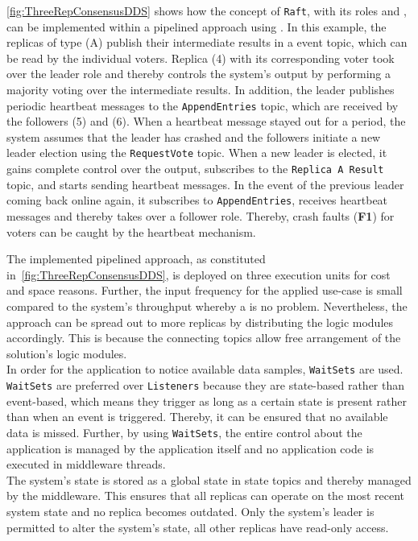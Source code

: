 \autoref{fig:ThreeRepConsensusDDS} shows how the concept of \texttt{Raft}, with its roles and , can be implemented within a pipelined approach using .
In this example, the replicas of type (A) publish their intermediate results in a  event topic, which can be read by the individual voters.
Replica (4) with its corresponding voter took over the leader role and thereby controls the system's output by performing a majority voting over the intermediate results.
In addition, the leader publishes periodic heartbeat messages to the \texttt{AppendEntries} topic, which are received by the followers (5) and (6).
When a heartbeat message stayed out for a period, the system assumes that the leader has crashed and the followers initiate a new leader election using the \texttt{RequestVote} topic.
When a new leader is elected, it gains complete control over the output, subscribes to the \texttt{Replica A Result} topic, and starts sending heartbeat messages.
In the event of the previous leader coming back online again, it subscribes to \texttt{AppendEntries}, receives heartbeat messages and thereby takes over a follower role.
Thereby, crash faults (\textbf{F1}) for voters can be caught by the heartbeat mechanism.

The implemented pipelined approach, as constituted in~\autoref{fig:ThreeRepConsensusDDS}, is deployed on three execution units for cost and space reasons.
Further, the input frequency for the applied use-case is small compared to the system's throughput whereby a \ChallengeThrough is no problem.
Nevertheless, the approach can be spread out to more replicas by distributing the logic modules accordingly.
This is because the connecting  topics allow free arrangement of the solution's logic modules.
\\

In order for the application to notice available data samples, \texttt{WaitSets} are used.
\texttt{WaitSets} are preferred over \texttt{Listeners} because they are state-based rather than event-based, which means they trigger as long as a certain state is present rather than when an event is triggered.
Thereby, it can be ensured that no available data is missed.
Further, by using \texttt{WaitSets}, the entire control about the application is managed by the application itself and no application code is executed in middleware threads.
\\

The system's state is stored as a global state in  state topics and thereby managed by the middleware.
This ensures that all replicas can operate on the most recent system state and no replica becomes outdated.
Only the system's leader is permitted to alter the system's state, all other replicas have read-only access.
\\

